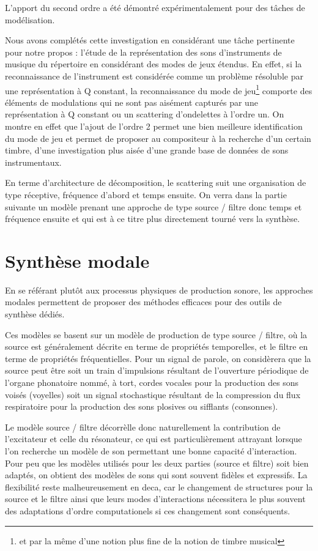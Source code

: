 L'apport du second ordre a été démontré expérimentalement pour des tâches de modélisation\cite{anden2014deep}.

Nous avons complétés cette investigation en considérant une tâche pertinente pour notre propos : l'étude de la représentation des sons d'instruments de musique du répertoire en considérant des modes de jeux étendus. En effet, si la reconnaissance de l'instrument est considérée comme un problème résoluble par une représentation à Q constant\cite{}, la reconnaissance du mode de jeu\footnote{et par la même d'une notion plus fine de la notion de timbre musical} comporte des éléments de modulations qui ne sont pas aisément capturés par une représentation à Q constant ou un scattering d'ondelettes à l'ordre un. On montre en effet que l'ajout de l'ordre 2 permet une bien meilleure identification du mode de jeu et permet de proposer au compositeur à la recherche d'un certain timbre, d'une investigation plus aisée d'une grande base de données de sons instrumentaux\cite{}.

En terme d'architecture de décomposition, le scattering suit une organisation de type réceptive, fréquence d'abord et temps ensuite. On verra dans la partie suivante un modèle prenant une approche de type source / filtre donc temps et fréquence ensuite et qui est à ce titre plus directement tourné vers la synthèse.

\section{ \nmu Synthèse modale}

En se référant plutôt aux processus physiques de production sonore, les approches modales permettent de proposer des méthodes efficaces pour des outils de synthèse dédiés.

Ces modèles se basent sur un modèle de production de type source / filtre, où la source est généralement décrite en terme de propriétés temporelles, et le filtre en terme de propriétés fréquentielles. Pour un signal de parole, on considèrera que la source peut être soit un train d'impulsions résultant de l'ouverture périodique de l'organe phonatoire nommé, à tort,  cordes vocales pour la production des sons voisés (voyelles) soit un signal stochastique résultant de la compression du flux respiratoire pour la production des sons plosives ou sifflants (consonnes).

Le modèle source / filtre décorrèlle donc naturellement la contribution de l'excitateur et celle du résonateur, ce qui est particulièrement attrayant lorsque l'on recherche un modèle de son permettant une bonne capacité d'interaction. Pour peu que les modèles utilisés pour les deux parties (source et filtre) soit bien adaptés, on obtient des modèles de sons qui sont souvent fidèles et expressifs\cite{modalys, marseille}. La flexibilité reste malheureusement en deca, car le changement de structures pour la source et le filtre ainsi que leurs modes d'interactions nécessitera le plus souvent des adaptations d'ordre computationels si ces changement sont conséquents.

